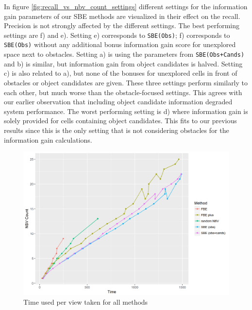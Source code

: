\documentclass[a4paper,11pt,english]{article}
\begin{document}
In figure \ref{fig:recall_vs_nbv_count_settings} different settings for the information gain parameters of our SBE methods are visualized in their effect on the recall. Precision is not strongly affected by the different settings.
The best performing settings are f) and e).
Setting e) corresponds to \texttt{SBE(Obs)}; f) corresponds to \texttt{SBE(Obs)} without any additional bonus information gain score for unexplored space next to obstacles.
Setting a) is using the parameters from \texttt{SBE(Obs+Cands)} and b) is similar, but information gain from object candidates is halved.
Setting c) is also related to a), but none of the bonuses for unexplored cells in front of obstacles or object candidates are given.
These three settings perform similarly to each other, but much worse than the obstacle-focused settings.
This agrees with our earlier observation that including object candidate information degraded system performance.
The worst performing setting is d) where information gain is solely provided for cells containing object candidates.
This fits to our previous results since this is the only setting that is not considering obstacles for the information gain calculations.


\begin{figure}[h]
	\begin{center}
		\includegraphics[width=\textwidth]{src/Plots/nbv_count_vs_time.png}
		\caption{Time used per view taken for all methods}
		\label{fig:nbv_count_vs_time}
	\end{center}
\end{figure}
\end{document}
